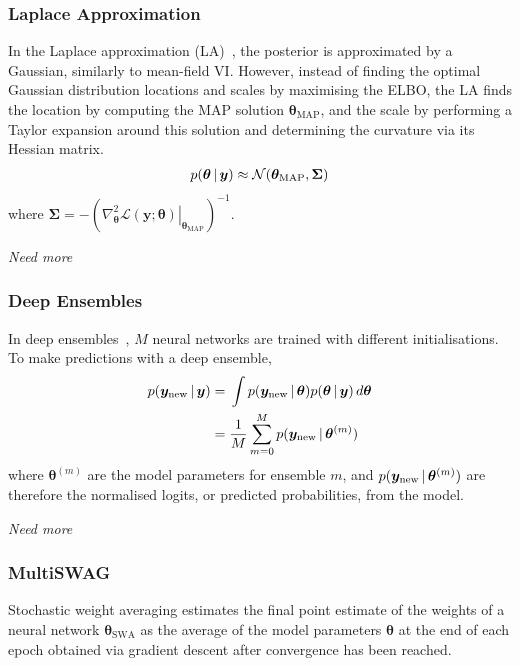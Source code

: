 \documentclass[10pt,a4paper,twocolumn]{article}
\begin{document}
\subsubsection{Laplace Approximation}
In the Laplace approximation (LA)~\cite{daxberger2021laplace}, the posterior is approximated by a Gaussian, similarly to mean-field VI.
However, instead of finding the optimal Gaussian distribution locations and scales by maximising the ELBO, the LA finds the location by computing the MAP solution \(\bm \theta_{\text{MAP}}\), and the scale by performing a Taylor expansion around this solution and determining the curvature via its Hessian matrix.
\begin{align}
    p(\bm{\theta} \, | \, \bm y) \approx \mathcal{N}(\bm \theta_{\text{MAP}}, \bm\Sigma)
\end{align}
where \(\bm\Sigma = -(\left.\nabla^2_{\bm \theta} \mathcal{L}(\bm y; \bm \theta) \right|_{\bm \theta_\mathrm{MAP}})^{-1}\).

\emph{Need more}

\subsubsection{Deep Ensembles}
In deep ensembles~\cite{lakshminarayanan2017simple}, \(M\) neural networks are trained with different initialisations.
To make predictions with a deep ensemble,
\begin{align}
    p(\bm y_{\mathrm{new}} \, | \, \bm y) 
    ={}& \int p(\bm y_{\mathrm{new}} \, | \, \bm \theta) p(\bm \theta \, | \, \bm y)\,d\bm\theta \nonumber\\
    ={}& \frac{1}{M} \sum_{m=0}^M p(\bm y_{\mathrm{new}} \, | \, \bm\theta^{(m)})
\end{align}
where \(\bm\theta^{(m)}\) are the model parameters for ensemble \(m\), and \(p(\bm y_{\mathrm{new}} \, | \, \bm\theta^{(m)})\) are therefore the normalised logits, or predicted probabilities, from the model.

\emph{Need more}

\subsubsection{MultiSWAG}

Stochastic weight averaging estimates the final point estimate of the weights of a neural network \(\bm \theta_\mathrm{SWA}\) as the average of the model parameters \(\bm \theta\) at the end of each epoch obtained via gradient descent after convergence has been reached.
\end{document}

